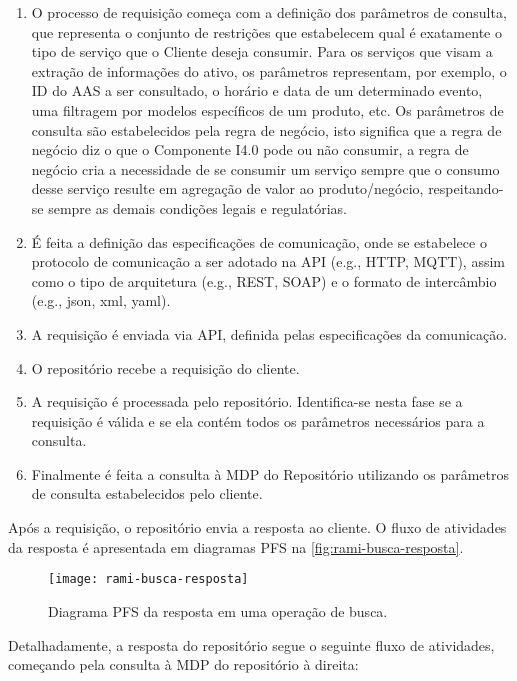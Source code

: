 	\begin{enumerate}
		\item O processo de requisição começa com a definição dos parâmetros de consulta, que representa o conjunto de restrições que estabelecem qual é exatamente o tipo de serviço que o Cliente deseja consumir. Para os serviços que visam a extração de informações do ativo, os parâmetros representam, por exemplo, o ID do AAS a ser consultado, o horário e data de um determinado evento, uma filtragem por modelos específicos de um produto, etc. Os parâmetros de consulta são estabelecidos pela regra de negócio, isto significa que a regra de negócio diz o que o Componente I4.0 pode ou não consumir, a regra de negócio cria a necessidade de se consumir um serviço sempre que o consumo desse serviço resulte em agregação de valor ao produto/negócio, respeitando-se sempre as demais condições legais e regulatórias.
		\item É feita a definição das especificações de comunicação, onde se estabelece o protocolo de comunicação a ser adotado na API (e.g., HTTP, MQTT), assim como o tipo de arquitetura (e.g., REST, SOAP) e o formato de intercâmbio (e.g., json, xml, yaml).
		\item A requisição é enviada via API, definida pelas especificações da comunicação.
		\item O repositório recebe a requisição do cliente.
		\item A requisição é processada pelo repositório. Identifica-se nesta fase se a requisição é válida e se ela contém todos os parâmetros necessários para a consulta.
		\item Finalmente é feita a consulta à MDP do Repositório utilizando os parâmetros de consulta estabelecidos pelo cliente.
	\end{enumerate}

	Após a requisição, o repositório envia a resposta ao cliente. O fluxo de atividades da resposta é apresentada em diagramas PFS na \autoref{fig:rami-busca-resposta}.

	\begin{figure}[htb]
		\centering
		\caption{Diagrama PFS da resposta em uma operação de busca.}
		\label{fig:rami-busca-resposta}
		\texttt{[image: rami-busca-resposta]}
	\end{figure}

	Detalhadamente, a resposta do repositório segue o seguinte fluxo de atividades, começando pela consulta à MDP do repositório à direita:
	
